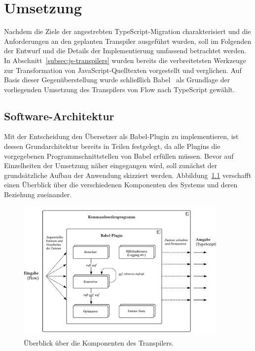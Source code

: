 \chapter{Umsetzung}
\label{chap:implementation}

Nachdem die Ziele der angestrebten TypeScript-Migration charakterisiert und die Anforderungen an den geplanten Transpiler ausgeführt wurden, soll im Folgenden der Entwurf und die Details der Implementierung umfassend betrachtet werden. In Abschnitt~\ref{subsec:js-transpilers} wurden bereits die verbreitetsten Werkzeuge zur Transformation von JavaScript-Quelltexten vorgestellt und verglichen. Auf Basis dieser Gegenüberstellung wurde schließlich Babel~\autocite{BABEL} als Grundlage der vorliegenden Umsetzung des Transpilers von Flow nach TypeScript gewählt.

\section{Software-Architektur}
\label{sec:software-architecture}

Mit der Entscheidung den Übersetzer als Babel-Plugin zu implementieren, ist dessen Grundarchitektur bereits in Teilen festgelegt, da alle Plugins die vorgegebenen Programmschnittstellen von Babel erfüllen müssen. Bevor auf Einzelheiten der Umsetzung näher eingegangen wird, soll zunächst der grundsätzliche Aufbau der Anwendung skizziert werden. Abbildung~\ref{fig:architecture-overview} verschafft einen Überblick über die verschiedenen Komponenten des Systems und deren Beziehung zueinander.

\begin{figure}[tbp]
  \centering
  \includegraphics[width=0.92\textwidth]{src/4_Umsetzung/fig/architecture-overview.pdf}
	\caption{Überblick über die Komponenten des Transpilers.}
	\label{fig:architecture-overview}
\end{figure}

